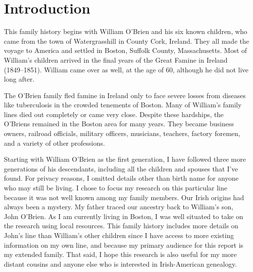 \chapter{Introduction}

This family history begins with William O'Brien and his six known children, who came from the town of Watergrasshill in County Cork, Ireland. They all made the voyage to America and settled in Boston, Suffolk County, Massachusetts. Most of William's children arrived in the final years of the Great Famine in Ireland (1849--1851). William came over as well, at the age of 60, although he did not live long after.

The O'Brien family fled famine in Ireland only to face severe losses from diseases like tuberculosis in the crowded tenements of Boston. Many of William's family lines died out completely or came very close. Despite these hardships, the O'Briens remained in the Boston area for many years. They became business owners, railroad officials, military officers, musicians, teachers, factory foremen, and a variety of other professions.

Starting with William O'Brien as the first generation, I have followed three more generations of his descendants, including all the children and spouses that I've found. For privacy reasons, I omitted details other than birth name for anyone who may still be living. I chose to focus my research on this particular line because it was not well known among my family members. Our Irish origins had always been a mystery. My father traced our ancestry back to William's son, John O'Brien. As I am currently living in Boston, I was well situated to take on the research using local resources. This family history includes more details on John's line than William's other children since I have access to more existing information on my own line, and because my primary audience for this report is my extended family. That said, I hope this research is also useful for my more distant cousins and anyone else who is interested in Irish-American genealogy. 


